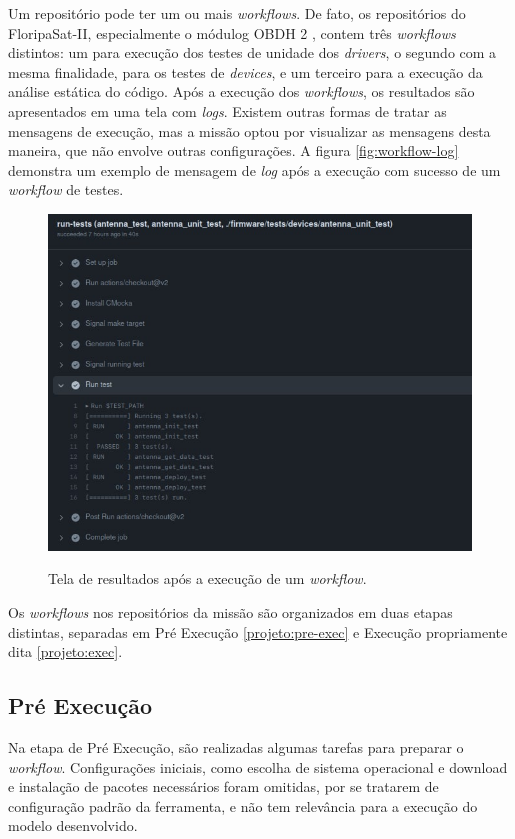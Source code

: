             Um repositório pode ter um ou mais \textit{workflows}. De fato, os repositórios do FloripaSat-II, especialmente o módulog OBDH 2 \cite{obdh2-github}, contem três \textit{workflows} distintos: um para execução dos testes de unidade dos \textit{drivers}, o segundo com a mesma finalidade, para os testes de \textit{devices}, e um terceiro para a execução da análise estática do código. Após a execução dos \textit{workflows}, os resultados são apresentados em uma tela com \textit{logs}. Existem outras formas de tratar as mensagens de execução, mas a missão optou por visualizar as mensagens desta maneira, que não envolve outras configurações. A figura \autoref{fig:workflow-log} demonstra um exemplo de mensagem de \textit{log} após a execução com sucesso de um \textit{workflow} de testes.
            
            \begin{figure}[ht!]
                \centering
                \caption{Tela de resultados após a execução de um \textit{workflow}.}
                \includegraphics[width=\textwidth]{images/workflow_log.jpg}
                \label{fig:workflow-log}
            \end{figure}
            
            Os \textit{workflows} nos repositórios da missão são organizados em duas etapas distintas, separadas em Pré Execução \autoref{projeto:pre-exec} e Execução propriamente dita \autoref{projeto:exec}.
        
        \subsection{Pré Execução}
        \label{projeto:pre-exec}
            Na etapa de Pré Execução, são realizadas algumas tarefas para preparar o \textit{workflow}. Configurações iniciais, como escolha de sistema operacional e download e instalação de pacotes necessários foram omitidas, por se tratarem de configuração padrão da ferramenta, e não tem relevância para a execução do modelo desenvolvido.
            
